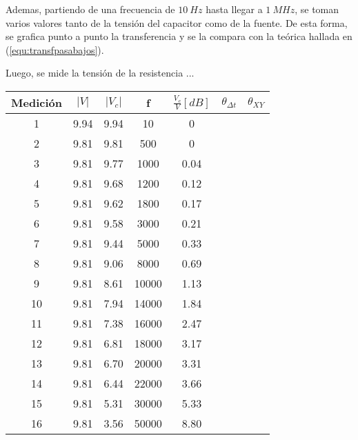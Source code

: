 \documentclass[a4paper]{article}
\begin{document}
Ademas, partiendo de una frecuencia de $ 10 \ Hz $ hasta llegar a $ 1 \ MHz $, se toman varios valores tanto de la tensión del capacitor como de la fuente. De esta forma, se grafica punto a punto la transferencia y se la compara con la teórica hallada en (\ref{equ:transfpasabajos}).


Luego, se mide la tensión de la resistencia ...

 \begin{center}
     \begin{table}[H]
     \centering
     \renewcommand{\arraystretch}{1.3}
     \label{table:Filtro pasabajos}
         \begin{tabular}{ c c c c c c c }
            \hline 
             Medici\'on &  $|V|$ & $|V_c|$ & f & $\frac{V_c}{V}[dB]$ & $\theta_{\Delta t}$  &  $\theta_{XY}$\\
             \hline
                1&	9.94&	9.94&	10  &  	0 & \\
                2&	9.81&	9.81&	500	 &  0 & \\
                3&	9.81&	9.77&	1000&	0.04\\
                4&	9.81&	9.68&	1200&	0.12\\
                5&	9.81&	9.62&	1800&	0.17\\
                6&	9.81&	9.58&	3000&	0.21\\
                7&	9.81&	9.44&	5000&	0.33\\
                8&	9.81&	9.06&	8000&	0.69\\
                9&	9.81&	8.61&	10000&	1.13\\
                10&	9.81&	7.94&	14000&	1.84\\
                11&	9.81&	7.38&	16000&	2.47\\
                12&	9.81&	6.81&	18000&	3.17\\
                13&	9.81&	6.70&   20000&	3.31\\
                14&	9.81&	6.44&	22000&	3.66\\
                15&	9.81&	5.31&	30000&	5.33\\
                16&	9.81&	3.56&	50000&	8.80\\

\end{tabular}
\end{table}
\end{center}
\end{document}
